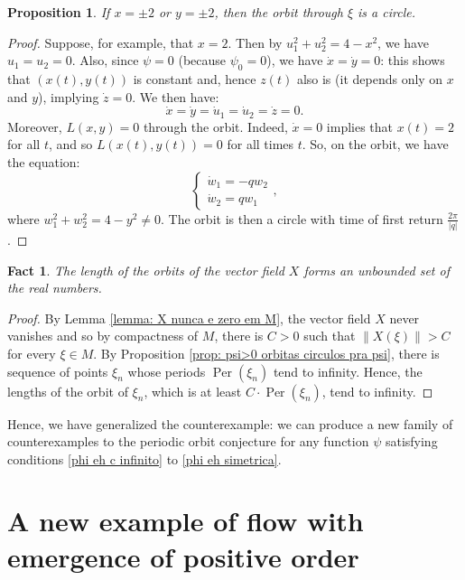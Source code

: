 \documentclass[11pt,reqno]{amsart}
\theoremstyle{plain}
\newtheorem{prop}[theorem]{Proposition}
\newtheorem{fact}[theorem]{Fact}
\theoremstyle{definition}
\theoremstyle{remark}
\theoremstyle{plain}
\numberwithin{equation}{section}
\newcommand{\Per}{\operatorname{Per}}
\begin{document}
									\begin{prop} \label{lemma: orbitas circulos em x=2 pra psi}
									If $x=\pm 2$ or $y=\pm 2$, then the orbit through \(\xi\) is a circle.
									\end{prop}
									\begin{proof}
									Suppose, for example, that $x=2$. Then by $u_{1}^{2}+u_{2}^{2}=4-x^{2}$, we have $u_{1}=u_{2}=0$. Also, since $\psi=0$ (because $\psi_{0}=0$), we have $\dot{x}=\dot{y}=0$: this shows that $(x(t),y(t))$ is constant and, hence $z(t)$ also is (it depends only on $x$ and $y$), implying $\dot{z}=0$. We then have: $$\dot{x}=\dot{y}=\dot{u}_{1}=\dot{u}_{2}=\dot{z}=0.$$ Moreover, $L(x,y)=0$ through the orbit. Indeed, $\dot{x}=0$ implies that $x(t)=2$ for all $t$, and so $L(x(t),y(t))=0$ for all times $t$. So, on the orbit, we have the equation: $$\begin{cases}
										\dot{w}_{1}=-qw_{2}\\
										\dot{w}_{2}=qw_{1}
									\end{cases},$$ where $w^{2}_{1}+w^{2}_{2}=4-y^{2}\neq 0$. The orbit is then a circle with time of first return $\frac{2\pi}{|q|}$. 
									\end{proof}
									
									\begin{fact}\label{prop: orbitas vao para infinito para phi}
									The length of the orbits of the vector field $X$ forms an unbounded set of the real numbers.
									\end{fact}
									\begin{proof} 
									By Lemma \ref{lemma: X nunca e zero em M}, the vector field $X$ never vanishes and so by compactness of $M$, there is $C>0$ such that $\|X(\xi)\|>C$ for every $\xi\in M$. By Proposition \ref{prop: psi>0 orbitas circulos pra psi}, there is sequence of points $\xi_n$ whose periods $\Per(\xi_n)$ tend to infinity. Hence, the lengths of the orbit of $\xi_n$, which is at least $C\cdot  \Per(\xi_n)$, tend to infinity. 
									\end{proof}
							
						
					
				Hence, we have generalized the counterexample: we can produce a new family of counterexamples to the periodic orbit conjecture for any function $\psi$ satisfying conditions \ref{phi eh c infinito} to \ref{phi eh simetrica}.
			
\section{A new example of flow with emergence of positive order} \label{subsection: An example of foliation with positive order of emergence}
\end{document}
